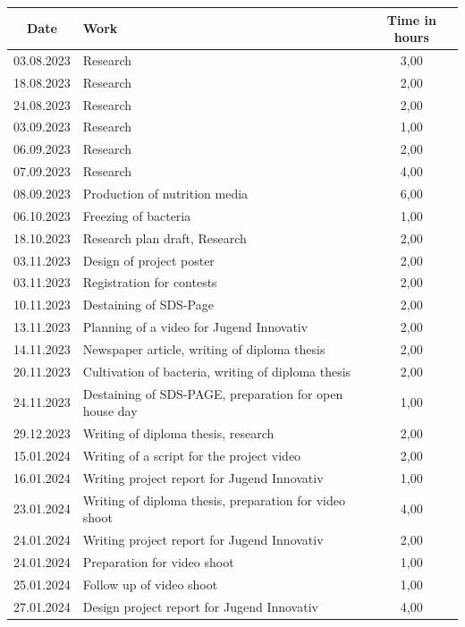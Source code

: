 \begin{longtable}{|c|p{9cm}|c|}
    \hline
    \textbf{Date} & \textbf{Work} & \textbf{Time in hours}  \\ \endhead \hline
    03.08.2023 & Research & 3,00 \\ \hline
    18.08.2023 & Research & 2,00 \\ \hline
    24.08.2023 & Research & 2,00 \\ \hline
    03.09.2023 & Research & 1,00 \\ \hline
    06.09.2023 & Research & 2,00 \\ \hline
    07.09.2023 & Research & 4,00 \\ \hline
    08.09.2023 & Production of nutrition media & 6,00 \\ \hline
    06.10.2023 & Freezing of bacteria & 1,00 \\ \hline
    18.10.2023 & Research plan draft, Research & 2,00 \\ \hline
    03.11.2023 & Design of project poster & 2,00 \\ \hline
    03.11.2023 & Registration for contests & 2,00 \\ \hline
    10.11.2023 & Destaining of SDS-Page & 2,00 \\ \hline
    13.11.2023 & Planning of a video for Jugend Innovativ & 2,00 \\ \hline
    14.11.2023 & Newspaper article, writing of diploma thesis & 2,00 \\ \hline
    20.11.2023 & Cultivation of bacteria, writing of diploma thesis & 2,00 \\ \hline
    24.11.2023 & Destaining of SDS-PAGE, preparation for open house day & 1,00 \\ \hline
    29.12.2023 & Writing of diploma thesis, research & 2,00 \\ \hline
    15.01.2024 & Writing of a script for the project video & 2,00 \\ \hline
    16.01.2024 & Writing project report for Jugend Innovativ & 1,00 \\ \hline
    23.01.2024 & Writing of diploma thesis, preparation for video shoot & 4,00 \\ \hline
    24.01.2024 & Writing project report for Jugend Innovativ & 2,00 \\ \hline
    24.01.2024 & Preparation for video shoot & 1,00 \\ \hline
    25.01.2024 & Follow up of video shoot & 1,00 \\ \hline
    27.01.2024 & Design project report for Jugend Innovativ & 4,00 \\ \hline

\end{longtable}
